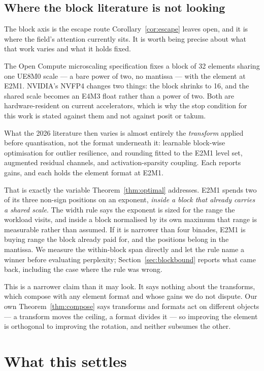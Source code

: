 \documentclass[11pt]{article}
\theoremstyle{definition}
\begin{document}
\subsection{Where the block literature is not looking}
\label{sec:blockrelated}

The block axis is the escape route Corollary~\ref{cor:escape} leaves open, and it
is where the field's attention currently sits. It is worth being precise about
what that work varies and what it holds fixed.

The Open Compute microscaling specification fixes a block of 32 elements sharing
one UE8M0 scale --- a bare power of two, no mantissa --- with the element at E2M1.
NVIDIA's NVFP4 changes two things: the block shrinks to 16, and the shared scale
becomes an E4M3 float rather than a power of two. Both are hardware-resident on
current accelerators, which is why the stop condition for this work is stated
against them and not against posit or takum.

What the 2026 literature then varies is almost entirely the \emph{transform}
applied before quantisation, not the format underneath it: learnable block-wise
optimisation for outlier resilience, and rounding fitted to the E2M1
level set, augmented residual channels, and activation-sparsity coupling. Each
reports gains, and each holds the element format at E2M1.

That is exactly the variable Theorem~\ref{thm:optimal} addresses. E2M1 spends two
of its three non-sign positions on an exponent, \emph{inside a block that already
carries a shared scale}. The width rule says the exponent is sized for the range
the workload visits, and inside a block normalised by its own maximum that range
is measurable rather than assumed. If it is narrower than four binades, E2M1 is
buying range the block already paid for, and the positions belong in the mantissa.
We measure the within-block span directly and let the rule name a winner before
evaluating perplexity; Section~\ref{sec:blockbound} reports what came back,
including the case where the rule was wrong.

This is a narrower claim than it may look. It says nothing about the transforms,
which compose with any element format and whose gains we do not dispute. Our own
Theorem~\ref{thm:compose} says transforms and formats act on different objects ---
a transform moves the ceiling, a format divides it --- so improving the element is
orthogonal to improving the rotation, and neither subsumes the other.


\section{What this settles}
\label{sec:settles}
\end{document}
